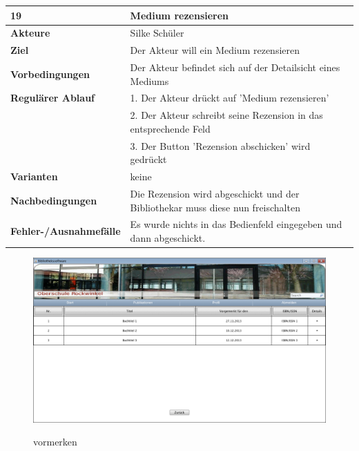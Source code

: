 \documentclass[fontsize=12pt,paper=a4,twoside]{scrartcl}
\begin{document}
\begin{table}[htbp]
\label{19}
\begin{tabular}{|l|p{10cm}|}
\hline 
\textbf{19} & \textbf{Medium rezensieren} \\ \hline
\textbf{Akteure} & Silke Schüler\\ \hline
\textbf{Ziel} & Der Akteur will ein Medium rezensieren \\ \hline
\textbf{Vorbedingungen} & Der Akteur befindet sich auf der Detailsicht eines Mediums \\ \hline
\textbf{Regulärer Ablauf} & 
1. Der Akteur drückt auf 'Medium rezensieren' \\
&2. Der Akteur schreibt seine Rezension in das entsprechende Feld\\
&3. Der Button 'Rezension abschicken' wird gedrückt\\
\hline
\textbf{Varianten} & 
keine \\ \hline
\textbf{Nachbedingungen} & Die Rezension wird abgeschickt und der Bibliothekar muss diese nun 
freischalten\\ \hline
\textbf{Fehler-/Ausnahmefälle} & Es wurde nichts in das Bedienfeld eingegeben und dann abgeschickt.\\
\hline
\end{tabular}
\end{table}

\begin{figure}[htbp]
\caption{vormerken}
\includegraphics[width=1\textwidth]{ScreensWebsite/VormerkungenSchueler.png}
  \label{vormerken}
\end{figure}
\end{document}

